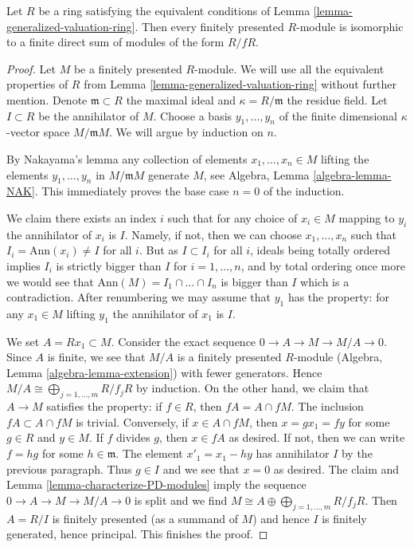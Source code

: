 \begin{lemma}
\label{lemma-generalized-valuation-ring-modules}
\begin{reference}
\cite[Theorem 1]{Warfield-Decomposition}
\end{reference}
Let $R$ be a ring satisfying the equivalent conditions of
Lemma \ref{lemma-generalized-valuation-ring}.
Then every finitely presented $R$-module
is isomorphic to a finite direct sum of modules of the form $R/fR$.
\end{lemma}

\begin{proof}
Let $M$ be a finitely presented $R$-module. We will use all
the equivalent properties of $R$ from
Lemma \ref{lemma-generalized-valuation-ring}
without further mention. Denote $\mathfrak m \subset R$
the maximal ideal and $\kappa = R/\mathfrak m$ the residue field.
Let $I \subset R$ be the annihilator of $M$.
Choose a basis $y_1, \ldots, y_n$ of the finite dimensional
$\kappa$-vector space $M/\mathfrak m M$. We will argue
by induction on $n$.

\medskip\noindent
By Nakayama's lemma any collection of elements $x_1, \ldots, x_n \in M$
lifting the elements $y_1, \ldots, y_n$ in $M/\mathfrak m M$
generate $M$, see Algebra, Lemma \ref{algebra-lemma-NAK}.
This immediately proves the base case $n = 0$ of the induction.

\medskip\noindent
We claim there exists an index $i$ such that for any choice
of $x_i \in M$ mapping to $y_i$ the annihilator of $x_i$ is $I$.
Namely, if not, then we can choose $x_1, \ldots, x_n$ such
that $I_i = \text{Ann}(x_i) \not = I$ for all $i$. But as
$I \subset I_i$ for all $i$, ideals being totally ordered
implies $I_i$ is strictly bigger than $I$ for $i = 1, \ldots, n$,
and by total ordering once more we would see that
$\text{Ann}(M) = I_1 \cap \ldots \cap I_n$ is bigger than $I$
which is a contradiction. After renumbering we may assume that
$y_1$ has the property: for any $x_1 \in M$ lifting $y_1$
the annihilator of $x_1$ is $I$.

\medskip\noindent
We set $A = Rx_1 \subset M$. Consider the exact sequence
$0 \to A \to M \to M/A \to 0$. Since $A$ is finite, we see that
$M/A$ is a finitely presented $R$-module
(Algebra, Lemma \ref{algebra-lemma-extension}) with fewer generators.
Hence $M/A \cong \bigoplus_{j = 1, \ldots, m} R/f_jR$ by induction.
On the other hand, we claim that $A \to M$ satisfies the property:
if $f \in R$, then $fA = A \cap fM$. The inclusion $fA \subset A \cap fM$
is trivial. Conversely, if $x \in A \cap fM$, then $x = gx_1 = f y$
for some $g \in R$ and $y \in M$. If $f$ divides $g$, then $x \in fA$
as desired. If not, then we can write $f = hg$ for some $h \in \mathfrak m$.
The element $x'_1 = x_1 - hy$ has annihilator $I$ by the previous
paragraph. Thus $g \in I$ and we see that $x = 0$ as desired.
The claim and Lemma \ref{lemma-characterize-PD-modules}
imply the sequence $0 \to A \to M \to M/A \to 0$ is split
and we find $M \cong A \oplus \bigoplus_{j = 1, \ldots, m} R/f_jR$.
Then $A = R/I$ is finitely presented (as a summand of $M$)
and hence $I$ is finitely generated, hence principal.
This finishes the proof.
\end{proof}